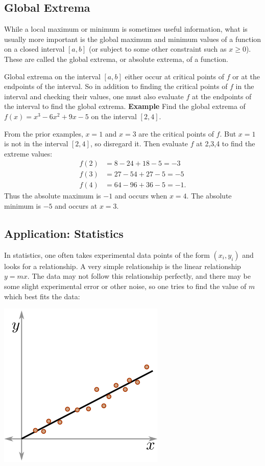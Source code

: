 \documentclass[twoside,openright,titlepage,a4paper]{book}
\begin{document}
\begin{sloppypar}
\subsection{Global Extrema}				

While a local maximum or minimum is sometimes useful information, what is usually more important is the global maximum and minimum values of a function on a closed interval $\left[a,b\right]$ (or subject to some other constraint such as $x \geq 0$). These are called the global extrema, or absolute extrema, of a function.

Global extrema on the interval $\left[a,b\right]$ either occur at critical points of $f$ or at the endpoints of the interval. So in addition to finding the critical points of $f$ in the interval and checking their values, one must also evaluate $f$ at the endpoints of the interval to find the global extrema.
\bigbreak
\textbf{Example} Find the global extrema of $f(x) = x^3 - 6x^2+9x-5$ on the interval $\left[2,4\right]$.
\begin{examplebox}
From the prior examples, $x=1$ and $x=3$ are the critical points of $f$. But $x=1$ is not in the interval $\left[2,4\right]$, so disregard it. Then evaluate $f$ at 2,3,4 to find the extreme values:
\begin{align*}
f(2)&=8-24+18-5=-3 \\
f(3) &= 27-54+27-5=-5 \\
f(4) &= 64-96+36-5 = -1.
\end{align*}
Thus the absolute maximum is $-1$ and occurs when $x=4$. The absolute minimum is $-5$ and occurs at $x=3$.	
\end{examplebox}

\subsection{Application: Statistics}

In statistics, one often takes experimental data points of the form $(x_i,y_i)$ and looks for a relationship. A very simple relationship is the linear relationship $y = mx$. The data may not follow this relationship perfectly, and there may be some slight experimental error or other noise, so one tries to find the value of $m$ which best fits the data:
\begin{center}\includegraphics[scale=0.6]{DataPlot}\end{center}


\end{sloppypar}
\end{document}
